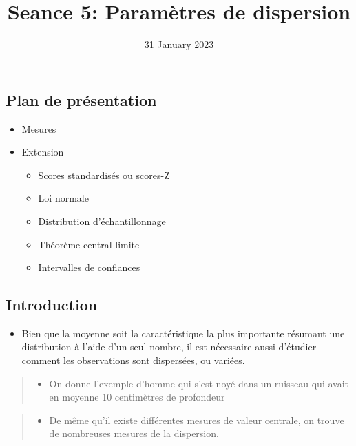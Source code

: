 \documentclass[
]{article}
\title{Seance 5: Paramètres de dispersion}
\author{Visseho Adjiwanou \footnote{corresponding author -
  \href{mailto:adjiwanou.vissého@uqam.ca}{\nolinkurl{adjiwanou.vissého@uqam.ca}}} \and Sociology
department, Université du Québec à Montréal
(UQAM) \and co-authors \and }
\date{31 January 2023}
\providecommand{\tightlist}{%
  \setlength{\itemsep}{0pt}\setlength{\parskip}{0pt}}
\begin{document}
\maketitle

\hypertarget{plan-de-pruxe9sentation}{%
\subsection{Plan de présentation}\label{plan-de-pruxe9sentation}}

\begin{itemize}
\item
  Mesures
\item
  Extension

  \begin{itemize}
  \tightlist
  \item
    Scores standardisés ou scores-Z
  \item
    Loi normale
  \item
    Distribution d'échantillonnage
  \item
    Théorème central limite
  \item
    Intervalles de confiances
  \end{itemize}
\end{itemize}

\hypertarget{introduction}{%
\subsection{Introduction}\label{introduction}}

\begin{itemize}
\tightlist
\item
  Bien que la moyenne soit la caractéristique la plus importante
  résumant une distribution à l'aide d'un seul nombre, il est nécessaire
  aussi d'étudier comment les observations sont dispersées, ou variées.
\end{itemize}

\begin{quote}
\begin{itemize}
\tightlist
\item
  On donne l'exemple d'homme qui s'est noyé dans un ruisseau qui avait
  en moyenne 10 centimètres de profondeur
\end{itemize}
\end{quote}

\begin{quote}
\begin{itemize}
\tightlist
\item
  De même qu'il existe différentes mesures de valeur centrale, on trouve
  de nombreuses mesures de la dispersion.
\end{itemize}
\end{quote}
\end{document}
